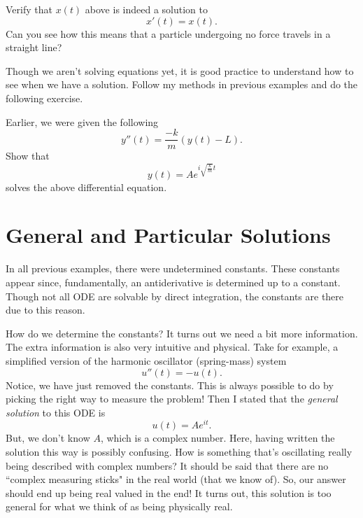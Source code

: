         \begin{exercise}
        Verify that $x(t)$ above is indeed a solution to 
        \[
        x'(t)=x(t).
        \]
        Can you see how this means that a particle undergoing no force travels in a straight line?
        \end{exercise}

        
        \noindent Though we aren't solving equations yet, it is good practice to understand how to see when we have a solution.  Follow my methods in previous examples and do the following exercise.
        
        \begin{exercise} Earlier, we were given the following
        \[
        y''(t) = \frac{-k}{m} (y(t)-L).
        \]
        Show that
        \[
        y(t) = Ae^{i\sqrt{\frac{k}{m}}t}
        \]
        solves the above differential equation.
        \end{exercise}
        
        \section{General and Particular Solutions}
        In all previous examples, there were undetermined constants.  These constants appear since, fundamentally, an antiderivative is determined up to a constant.  Though not all ODE are solvable by direct integration, the constants are there due to this reason.
        
        How do we determine the constants?  It turns out we need a bit more information.  The extra information is also very intuitive and physical.  Take for example, a simplified version of the harmonic oscillator (spring-mass) system
        \[
        u''(t) = -u(t).
        \]
        Notice, we have just removed the constants.  This is always possible to do by picking the right way to measure the problem! Then I stated that the \emph{general solution}  to this ODE is
        \[
        u(t)=Ae^{it}.
        \]
        But, we don't know $A$, which is a complex number. Here, having written the solution this way is possibly confusing.  How is something that's oscillating really being described with complex numbers? It should be said that there are no ``complex measuring sticks" in the real world (that we know of).  So, our answer should end up being real valued in the end! It turns out, this solution is too general for what we think of as being physically real.
        

